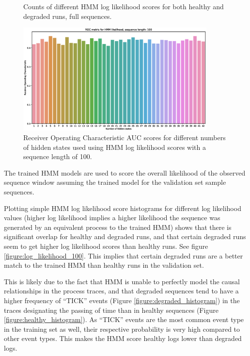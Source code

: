 \documentclass[journal]{IEEEtran}
\begin{document}
\begin{figure}[tb]
 \centering
 \caption{Counts of different HMM log likelihood scores for both healthy and degraded runs, full sequences.}
 \label{figure:log_likelihood_full}
\end{figure}

\begin{figure}[tb]
 \centering
 \includegraphics[width=10cm,keepaspectratio=true]{./roc_hmm_score_100.eps}
 \caption{Receiver Operating Characteristic AUC scores for different numbers of hidden states used using HMM log likelihood scores with a sequence length of 100.}
 \label{figure:roc_log_likelihoods_100}
\end{figure}

The trained HMM models are used to score the overall likelihood of the observed sequence window assuming the trained model for the validation set sample sequences.

Plotting simple HMM log likelihood score histograms for different log likelihood values (higher log likelihood implies a higher likelihood the sequence was generated by an equivalent process to the trained HMM) shows that there is significant overlap for healthy and degraded runs, and that certain degraded runs seem to get higher log likelihood scores than healthy runs. See figure \ref{figure:log_likelihood_100}. This implies that certain degraded runs are a better match to the trained HMM than healthy runs in the validation set.

This is likely due to the fact that HMM is unable to perfectly model the causal relationships in the process traces, and that degraded sequences tend to have a higher frequency of ``TICK'' events (Figure \ref{figure:degraded_histogram}) in the traces designating the passing of time than in healthy sequences (Figure \ref{figure:healthy_histogram}). As ``TICK'' events are the most common event type in the training set as well, their respective probability is very high compared to other event types. This makes the HMM score healthy logs  lower than degraded logs.
\end{document}
